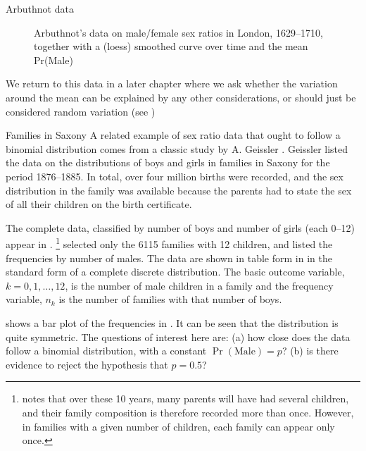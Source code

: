 \documentclass[10pt,krantz2]{krantz}\usepackage[]{graphicx}\usepackage[]{color}
\newenvironment{knitrout}{}{} %
\renewenvironment{knitrout}{\small\renewcommand{\baselinestretch}{.85}}{} %
\begin{document}
\begin{Example}[arbuthnot1]{Arbuthnot data}
\begin{knitrout}
\begin{figure}[!htbp]
\caption[Arbuthnot's data on male/female sex ratios]{Arbuthnot's data on male/female sex ratios in London, 1629--1710, together with a (loess) smoothed curve over time and the mean Pr(Male)\label{fig:arbuthnot12}}
\end{figure}


\end{knitrout}

We return to this data in a later chapter where we ask whether the variation around
the mean can be explained by any other considerations, or should just be considered
random variation (see )
\end{Example}

\begin{Example}[saxony1]{Families in Saxony}
A related example of sex ratio data that ought to follow a binomial distribution
comes from a classic study by A. Geissler \citeyearpar{Geissler:1889}.
Geissler listed the data on the distributions of boys and girls in families
in Saxony for the period 1876--1885. In total, over four million births were
recorded, and the sex distribution in the family was available because the parents had to state the sex of all their children on
the birth certificate.%

The complete data, classified by number of boys and number of girls
(each 0--12) appear in \citet[Table 1]{Edwards:1958}.%
\footnote{
\citet{Edwards:1958} notes that over these 10 years, many parents
will have had several children, and their family composition
is therefore recorded more than once.  However, in families with a given
number of children, each family can appear only once.
}
\citet[Table 6.2]{Lindsey:95} selected only the 6115 families with
12 children, and listed the frequencies by number of males.  The
data are shown in table form in  in the standard form
of a complete discrete distribution.  The basic outcome variable,
$k = 0, 1, \dots, 12$, is the number of male children in a family
and the frequency variable, $n_k$ is the number of families with that
number of boys.



 shows a bar plot of the frequencies in .
It can be seen that the distribution is quite symmetric.  The questions of interest
here are:
(a) how close does the data follow a binomial distribution, with a constant
$\Pr(\mathrm{Male}) = p$?
(b) is there evidence to reject the hypothesis that $ p = 0.5$?


\end{Example}
\end{document}
